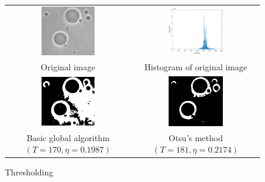 \documentclass[11pt,a4paper]{article}
\begin{document}
\begin{figure}[!htbp]
	\centering
	\begin{tabular}{cc} 
		\includegraphics[width=0.45\textwidth]{pro9/10_39_a}&
		\includegraphics[width=0.45\textwidth]{pro9/10_39_b}\\
		Original image &Histogram of original image \\
		\includegraphics[width=0.45\textwidth]{pro9/10_39_c}&
		\includegraphics[width=0.45\textwidth]{pro9/10_39_d}\\
		Basic global algorithm$(T=170,\eta=0.1987)$ & Otsu's method$(T=181,\eta=0.2174)$
	\end{tabular}
	\caption{Thresholding}
	\label{pro9_fig2}
\end{figure}
\end{document}
